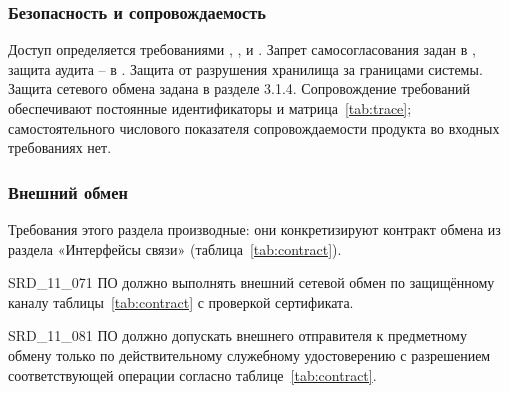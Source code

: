\documentclass{tpks}
\begin{document}
\subsubsection{Безопасность и сопровождаемость}
Доступ определяется требованиями , ,  и . Запрет самосогласования задан в , защита аудита -- в . Защита от разрушения хранилища за границами системы. Защита сетевого обмена задана в разделе 3.1.4. Сопровождение требований обеспечивают постоянные идентификаторы и матрица~\ref{tab:trace}; самостоятельного числового показателя сопровождаемости продукта во входных требованиях нет.
\subsubsection{Внешний обмен}\label{sec:exchange}
Требования этого раздела производные: они конкретизируют контракт обмена из раздела «Интерфейсы связи» (таблица~\ref{tab:contract}).

\begin{req}{SRD_11_07}{1}
ПО должно выполнять внешний сетевой обмен по защищённому каналу таблицы~\ref{tab:contract} с проверкой сертификата.
\end{req}

\begin{req}{SRD_11_08}{1}
ПО должно допускать внешнего отправителя к предметному обмену только по действительному служебному удостоверению с разрешением соответствующей операции согласно таблице~\ref{tab:contract}.
\end{req}
\end{document}
